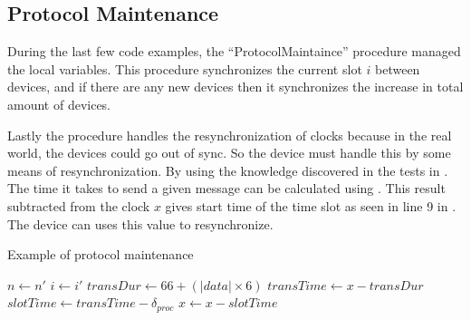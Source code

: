 \subsection{Protocol Maintenance}\label{subsec:protocolmaintanaince}
During the last few code examples, the ``ProtocolMaintaince'' procedure managed the local variables. 
This procedure synchronizes the current slot $i$ between devices, and if there are any new devices then it synchronizes the increase in total amount of devices.

Lastly the procedure handles the resynchronization of clocks because in the real world, the devices could go out of sync. 
So the  device must handle this by some means of resynchronization. 
By using the knowledge discovered in the tests in . 
The time it takes to send a given message can be calculated using . 
This result subtracted from the clock $x$ gives start time of the time slot as seen in line 9 in . 
The device can uses this value to resynchronize.

\begin{algorithm}[h]
\caption{Example of protocol maintenance}
\label{lst:maintaniance}
\begin{algorithmic}[1]
        \State $n \gets n'$
    \EndIf
    \State $i \gets i'$
    \State $transDur \gets 66 + (|data| \times 6)$ 
    \State $transTime \gets x - transDur$ 
    \State $slotTime \gets transTime - \delta_{proc}$ 
    \State $x \gets x - slotTime$         
\EndProcedure        
\end{algorithmic}    
\end{algorithm} 